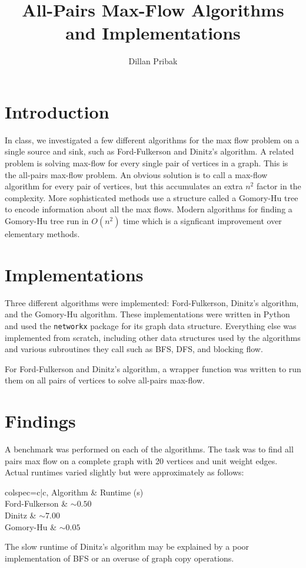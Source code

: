 \documentclass{article}
\begin{document}
\title{All-Pairs Max-Flow Algorithms and Implementations}
\author{Dillan Pribak}
\maketitle

\section*{Introduction}
In class, we investigated a few different algorithms for the max flow problem on a single source and sink, such as Ford-Fulkerson and Dinitz's algorithm. A related problem is solving max-flow for every single pair of vertices in a graph. This is the all-pairs max-flow problem. An obvious solution is to call a max-flow algorithm for every pair of vertices, but this accumulates an extra $n^{2}$ factor in the complexity. More sophisticated methods use a structure called a Gomory-Hu tree to encode information about all the max flows. Modern algorithms for finding a Gomory-Hu tree run in $O(n^{2})$ time which is a signficant improvement over elementary methods.

\section*{Implementations}
Three different algorithms were implemented: Ford-Fulkerson, Dinitz's algorithm, and the Gomory-Hu algorithm. These implementations were written in Python and used the \texttt{networkx} package for its graph data structure. Everything else was implemented from scratch, including other data structures used by the algorithms and various subroutines they call such as BFS, DFS, and blocking flow.

For Ford-Fulkerson and Dinitz's algorithm, a wrapper function was written to run them on all pairs of vertices to solve all-pairs max-flow.

\section*{Findings}
A benchmark was performed on each of the algorithms. The task was to find all pairs max flow on a complete graph with 20 vertices and unit weight edges. Actual runtimes varied slightly but were approximately as follows:

\begin{center}
\begin{tblr}{
	colspec={c|c},	
}
	Algorithm	& 	Runtime (s)\\
	\hline
	Ford-Fulkerson	& $\sim0.50$\\
	Dinitz	& 	$\sim7.00$\\
	Gomory-Hu	& 	$\sim0.05$\\
\end{tblr}	
\end{center}

The slow runtime of Dinitz's algorithm may be explained by a poor implementation of BFS or an overuse of graph copy operations.
\end{document}
